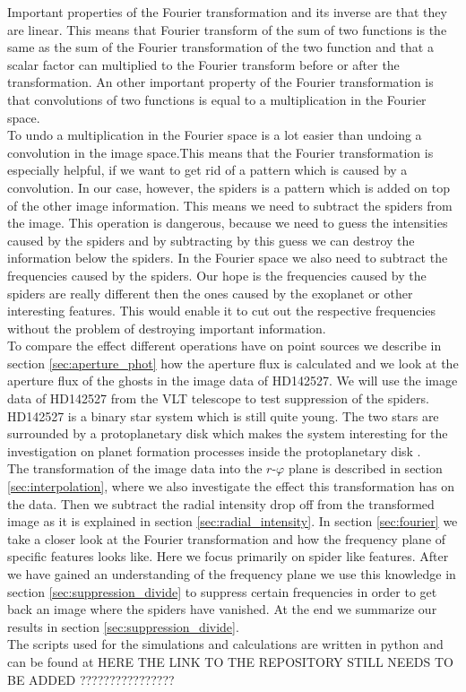 Important properties of the Fourier transformation and its inverse are that they are linear. This means that Fourier transform of the sum of two functions is the same as the sum of the Fourier transformation of the two function and that a scalar factor can multiplied to the Fourier transform before or after the transformation. An other important property of the Fourier transformation is that convolutions of two functions is equal to a multiplication in the Fourier space. \\
To undo a multiplication in the Fourier space is a lot easier than undoing a convolution in the image space.This means that the Fourier transformation is especially helpful, if we want to get rid of a pattern which is caused by a convolution. In our case, however, the spiders is a pattern which is added on top of the other image information. This means we need to subtract the spiders from the image. This operation is dangerous, because we need to guess the intensities caused by the spiders and by subtracting by this guess we can destroy the information below the spiders. In the Fourier space we also need to subtract the frequencies caused by the spiders. Our hope is the frequencies caused by the spiders are really different then the ones caused by the exoplanet or other interesting features. This would enable it to cut out the respective frequencies without the problem of destroying important information.\\
To compare the effect different operations have on point sources we describe in section \ref{sec:aperture_phot} how the aperture flux is calculated and we look at the aperture flux of the ghosts in the image data of HD142527. We will use the image data of HD142527 from the VLT telescope to test suppression of the spiders. HD142527 is a binary star system which is still quite young. The two stars are surrounded by a protoplanetary disk which makes the system interesting for the investigation on planet formation processes inside the protoplanetary disk \cite{HD142527}.\\
The transformation of the image data into the $r$-$\varphi$ plane is described in section \ref{sec:interpolation}, where we also investigate the effect this transformation has on the data. Then we subtract the radial intensity drop off from the transformed image as it is explained in section \ref{sec:radial_intensity}. In section \ref{sec:fourier} we take a closer look at the Fourier transformation and how the frequency plane of specific features looks like. Here we focus primarily on spider like features. After we have gained an understanding of the frequency plane we use this knowledge in section \ref{sec:suppression_divide} to suppress certain frequencies in order to get back an image where the spiders have vanished. At the end we summarize our results in section \ref{sec:suppression_divide}.\\
The scripts used for the simulations and calculations are written in python and can be found 
at HERE THE LINK TO THE REPOSITORY STILL NEEDS TO BE ADDED ????????????????
